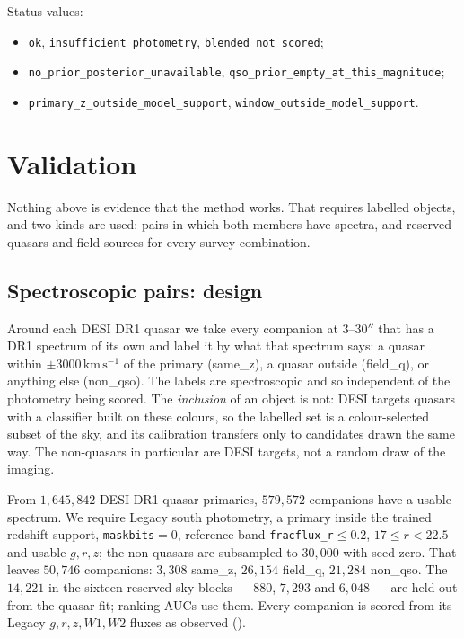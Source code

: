 \documentclass[11pt,a4paper]{article}
\newcommand{\kms}{\,\mathrm{km\,s^{-1}}}
\begin{document}
\noindent
Status values:
\begin{itemize}\setlength{\itemsep}{0pt}
\item \texttt{ok}, \texttt{insufficient\_photometry}, \texttt{blended\_not\_scored};
\item \texttt{no\_prior\_posterior\_unavailable},
      \texttt{qso\_prior\_empty\_at\_this\_magnitude};
\item \texttt{primary\_z\_outside\_model\_support},
      \texttt{window\_outside\_model\_support}.
\end{itemize}

\section{Validation}
\label{sec:validation}

Nothing above is evidence that the method works. That requires labelled
objects, and two kinds are used: pairs in which both members have spectra, and
reserved quasars and field sources for every survey combination.

\subsection{Spectroscopic pairs: design}

Around each DESI DR1 quasar we take every companion at $3$--$30''$ that has a
DR1 spectrum of its own and label it by what that spectrum says: a quasar within
$\pm3000\kms$ of the primary (\textsf{same\_z}), a quasar outside
(\textsf{field\_q}), or anything else (\textsf{non\_qso}). The labels are
spectroscopic and so independent of the photometry being scored. The
\emph{inclusion} of an object is not: DESI targets quasars with a classifier
built on these colours, so the labelled set is a colour-selected subset of the
sky, and its calibration transfers only to candidates drawn the same way. The
non-quasars in particular are DESI targets, not a random draw of the imaging.

From $1{,}645{,}842$ DESI DR1 quasar primaries, $579{,}572$ companions have a
usable spectrum. We require Legacy south photometry, a primary inside the
trained redshift support, \texttt{maskbits}$=0$, reference-band
\texttt{fracflux\_r}$\le0.2$, $17\le r<22.5$ and usable $g,r,z$; the non-quasars
are subsampled to $30{,}000$ with seed zero. That leaves $50{,}746$ companions:
$3{,}308$ \textsf{same\_z}, $26{,}154$ \textsf{field\_q}, $21{,}284$
\textsf{non\_qso}. The $14{,}221$ in the sixteen reserved sky blocks --- $880$,
$7{,}293$ and $6{,}048$ --- are held out from the quasar fit; ranking AUCs use
them. Every companion is scored from its Legacy $g,r,z,W1,W2$ fluxes as observed
().
\end{document}

